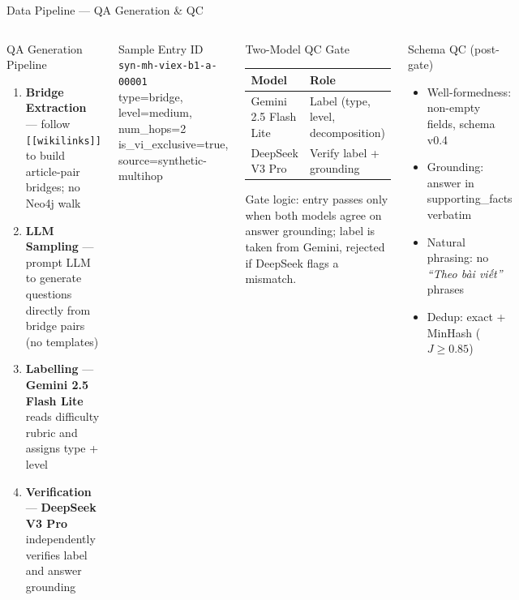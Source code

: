 \documentclass[aspectratio=169]{beamer}
\begin{document}
\begin{frame}[shrink=10]{Data Pipeline --- QA Generation \& QC}
\begin{columns}[T]
\begin{block}{QA Generation Pipeline}
\begin{enumerate}\small\setlength\itemsep{3pt}
  \item \textbf{Bridge Extraction} --- follow \texttt{[[wikilinks]]} to build article-pair bridges; no Neo4j walk
  \item \textbf{LLM Sampling} --- prompt LLM to generate questions directly from bridge pairs (no templates)
  \item \textbf{Labelling} --- \textbf{Gemini 2.5 Flash Lite} reads difficulty rubric and assigns type + level
  \item \textbf{Verification} --- \textbf{DeepSeek V3 Pro} independently verifies label and answer grounding
\end{enumerate}
\end{block}

\begin{exampleblock}{Sample Entry ID}
{\scriptsize \texttt{syn-mh-viex-b1-a-00001}\\
type=bridge, level=medium, num\_hops=2\\
is\_vi\_exclusive=true, source=synthetic-multihop}
\end{exampleblock}

\begin{block}{Two-Model QC Gate}
\begin{tabular}{@{}lp{2.8cm}@{}}
\toprule
\textbf{Model} & \textbf{Role} \\
\midrule
Gemini 2.5 Flash Lite & Label (type, level, decomposition) \\
DeepSeek V3 Pro       & Verify label + grounding \\
\bottomrule
\end{tabular}
\smallskip

{\scriptsize Gate logic: entry passes only when both models agree on answer grounding; label is taken from Gemini, rejected if DeepSeek flags a mismatch.}
\end{block}

\begin{block}{Schema QC (post-gate)}
\begin{itemize}\scriptsize\setlength\itemsep{1pt}
  \item Well-formedness: non-empty fields, schema v0.4
  \item Grounding: answer in supporting\_facts verbatim
  \item Natural phrasing: no \textit{``Theo bài viết''} phrases
  \item Dedup: exact + MinHash ($J \geq 0.85$)
\end{itemize}
\end{block}
\end{columns}
\end{frame}
\end{document}
